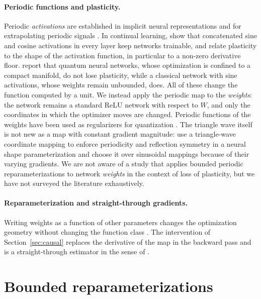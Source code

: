 \documentclass[11pt,a4paper]{article}
\begin{document}
\paragraph{Periodic functions and plasticity.}
Periodic \emph{activations} are established in implicit neural representations \citep{sitzmann2020implicit}
and for extrapolating periodic signals \citep{ziyin2020neural}. In continual learning,
\citet{lewandowski2025fourier} show that concatenated sine and cosine activations in every layer keep networks
trainable, and \citet{lillo2026activation} relate plasticity to the shape of the activation function,
in particular to a non-zero derivative floor. \citet{chen2026intrinsic} report that quantum neural networks,
whose optimization is confined to a compact manifold, do not lose plasticity, while a classical network with
sine activations, whose weights remain unbounded, does. All of these change the function computed by a unit. We instead apply the periodic map to
the \emph{weights}: the network remains a standard ReLU network with respect to $W$, and only the coordinates
in which the optimizer moves are changed. Periodic functions of the weights have been used as regularizers for
quantization \citep{naumov2018periodic}. The triangle wave itself is not new as a map with constant gradient
magnitude: \citet{dai2025shaping} use a triangle-wave coordinate mapping to enforce periodicity and reflection
symmetry in a neural shape parameterization and choose it over sinusoidal mappings because of their varying
gradients. We are not aware of a study that applies bounded periodic reparameterizations to network
\emph{weights} in the context of loss of plasticity, but we have not surveyed the literature exhaustively.

\paragraph{Reparameterization and straight-through gradients.}
Writing weights as a function of other parameters changes the optimization geometry without changing the
function class \citep{salimans2016weight}. The intervention of Section~\ref{sec:causal} replaces the derivative
of the map in the backward pass and is a straight-through estimator in the sense of \citet{bengio2013estimating}.

\section{Bounded reparameterizations}\label{sec:method}
\end{document}
